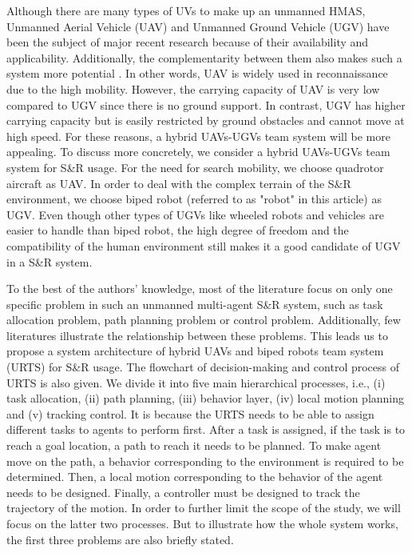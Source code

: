 \documentclass{ieeeaccess}
\begin{document}
Although there are many types of UVs to make up an unmanned HMAS, Unmanned Aerial Vehicle (UAV) and Unmanned Ground Vehicle (UGV) have been the subject of major recent research because of their availability and applicability. Additionally, the complementarity between them also makes such a system more potential \cite{arbanas2018decentralized}. In other words, UAV is widely used in reconnaissance due to the high mobility. However, the carrying capacity of UAV is very low compared to UGV since there is no ground support. In contrast, UGV has higher carrying capacity but is easily restricted by ground obstacles and cannot move at high speed. For these reasons, a hybrid UAVs-UGVs team system will be more appealing. To discuss more concretely, we consider a hybrid UAVs-UGVs team system for S\&R usage. For the need for search mobility, we choose quadrotor aircraft as UAV. In order to deal with the complex terrain of the S\&R environment, we choose biped robot (referred to as "robot" in this article) as UGV. Even though other types of UGVs like wheeled robots and vehicles are easier to handle than biped robot, the high degree of freedom and the compatibility of the human environment still makes it a good candidate of UGV in a S\&R system.

To the best of the authors' knowledge, most of the literature focus on only one specific problem in such an unmanned multi-agent S\&R system, such as task allocation problem, path planning problem or control problem. Additionally, few literatures illustrate the relationship between these problems. This leads us to propose a system architecture of hybrid UAVs and biped robots team system (URTS) for S\&R usage. The flowchart of decision-making and control process of URTS is also given. We divide it into five main hierarchical processes, i.e., (i) task allocation, (ii) path planning, (iii) behavior layer, (iv) local motion planning and (v) tracking control. It is because the URTS needs to be able to assign different tasks to agents to perform first. After a task is assigned, if the task is to reach a goal location, a path to reach it needs to be planned. To make agent move on the path, a behavior corresponding to the environment is required to be determined. Then, a local motion corresponding to the behavior of the agent needs to be designed. Finally, a controller must be designed to track the trajectory of the motion. In order to further limit the scope of the study, we will focus on the latter two processes. But to illustrate how the whole system works, the first three problems are also briefly stated.
\end{document}
